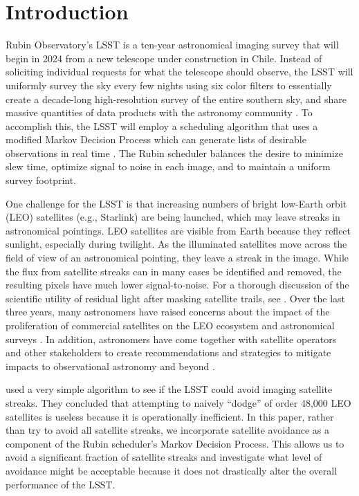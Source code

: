 \documentclass[twocolumn]{aastex631}
\begin{document}
\section{Introduction} \label{sec:intro}

Rubin Observatory's LSST is a ten-year astronomical imaging survey that will begin in 2024 from a new telescope under construction in Chile. Instead of soliciting individual requests for what the telescope should observe, the LSST will uniformly survey the sky every few nights using six color filters to essentially create a decade-long high-resolution survey of the entire southern sky, and share massive quantities of data products with the astronomy community \citep{overview}. To accomplish this, the LSST will employ a scheduling algorithm that uses a modified Markov Decision Process which can generate lists of desirable observations in real time \citep{naghib19}. The Rubin scheduler balances the desire to minimize slew time, optimize signal to noise in each image, and to maintain a uniform survey footprint.

One challenge for the LSST is that increasing numbers of bright low-Earth orbit (LEO) satellites (e.g., Starlink) are being launched, which may leave streaks in astronomical pointings. LEO satellites are visible from Earth because they reflect sunlight, especially during twilight. As the illuminated satellites move across the field of view of an astronomical pointing, they leave a streak in the image. While the flux from satellite streaks can in many cases be identified and removed, the resulting pixels have much lower signal-to-noise. For a thorough discussion of the scientific utility of residual light after masking satellite trails, see \citet{hasan22}. Over the last three years, many astronomers have raised concerns about the impact of the proliferation of commercial satellites on the LEO ecosystem and astronomical surveys \citep{lawrence22,tyson20}. In addition, astronomers have come together with satellite operators and other stakeholders to create recommendations and strategies to mitigate impacts to observational astronomy and beyond \citep{satcon1,satcon2,dqs1,dqs2}.

\citet{tyson20} used a very simple algorithm to see if the LSST could avoid imaging satellite streaks. They concluded that attempting to naively ``dodge'' of order 48,000 LEO satellites is useless because it is operationally inefficient.
In this paper, rather than try to avoid all satellite streaks, we incorporate satellite avoidance as a component of the Rubin scheduler's Markov Decision Process. This allows us to avoid a significant fraction of satellite streaks and investigate what level of avoidance might be acceptable because it does not drastically alter the overall performance of the LSST.
\end{document}
